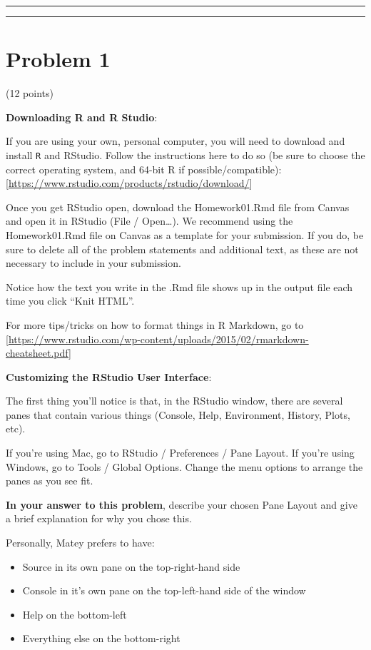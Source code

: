 \documentclass[]{article}
\providecommand{\tightlist}{%
  \setlength{\itemsep}{0pt}\setlength{\parskip}{0pt}}
\begin{document}
\begin{center}\rule{0.5\linewidth}{\linethickness}\end{center}

\begin{center}\rule{0.5\linewidth}{\linethickness}\end{center}

\hypertarget{problem-1}{%
\section{Problem 1}\label{problem-1}}

(12 points)

\textbf{Downloading R and R Studio}:

If you are using your own, personal computer, you will need to download
and install \texttt{R} and RStudio. Follow the instructions here to do
so (be sure to choose the correct operating system, and 64-bit R if
possible/compatible):
{[}\url{https://www.rstudio.com/products/rstudio/download/}{]}

Once you get RStudio open, download the Homework01.Rmd file from Canvas
and open it in RStudio (File / Open\ldots). We recommend using the
Homework01.Rmd file on Canvas as a template for your submission. If you
do, be sure to delete all of the problem statements and additional text,
as these are not necessary to include in your submission.

Notice how the text you write in the .Rmd file shows up in the output
file each time you click ``Knit HTML''.

For more tips/tricks on how to format things in R Markdown, go to
{[}\url{https://www.rstudio.com/wp-content/uploads/2015/02/rmarkdown-cheatsheet.pdf}{]}

\textbf{Customizing the RStudio User Interface}:

The first thing you'll notice is that, in the RStudio window, there are
several panes that contain various things (Console, Help, Environment,
History, Plots, etc).

If you're using Mac, go to RStudio / Preferences / Pane Layout. If
you're using Windows, go to Tools / Global Options. Change the menu
options to arrange the panes as you see fit.

\textbf{In your answer to this problem}, describe your chosen Pane
Layout and give a brief explanation for why you chose this.

Personally, Matey prefers to have:

\begin{itemize}
\tightlist
\item
  Source in its own pane on the top-right-hand side
\item
  Console in it's own pane on the top-left-hand side of the window
\item
  Help on the bottom-left
\item
  Everything else on the bottom-right
\end{itemize}
\end{document}
